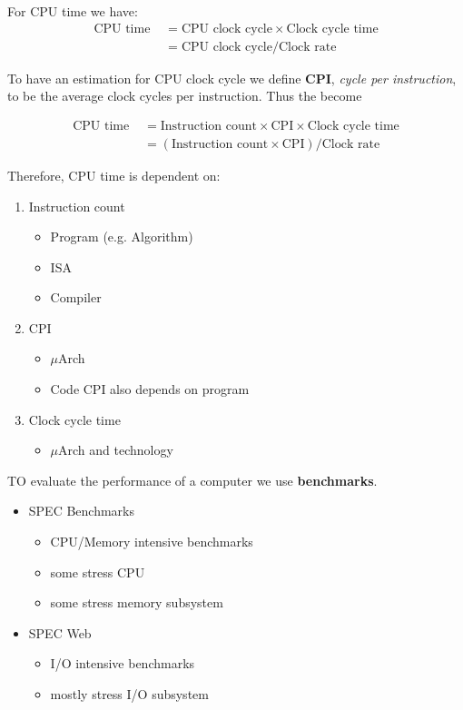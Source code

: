 For CPU time we have:
\begin{align}
    \text{CPU time } & = \text{CPU clock cycle} \times \text{Clock cycle time} \label{eq:CPUTime1} \\
                     & = \text{CPU clock cycle} / \text{Clock rate} \label{eq:CPUTime2}
\end{align}

To have an estimation for CPU clock cycle we define \textbf{CPI}, \textit{cycle per instruction}, to be the average clock cycles per instruction. Thus the  become

\begin{align*}
    \text{CPU time } & = \text{Instruction count} \times \text{CPI} \times \text{Clock cycle time} \\
                     & = (\text{Instruction count} \times \text{CPI}) / \text{Clock rate}
\end{align*}

Therefore, CPU time is dependent on:
\begin{enumerate}
    \item Instruction count
          \begin{itemize}
              \item Program (e.g. Algorithm)
              \item ISA
              \item Compiler
          \end{itemize}
    \item CPI
          \begin{itemize}
              \item \(\mu\)Arch
              \item Code CPI also depends on program
          \end{itemize}
    \item Clock cycle time
          \begin{itemize}
              \item \(\mu\)Arch and technology
          \end{itemize}
\end{enumerate}

TO evaluate the performance of a computer we use \textbf{benchmarks}.

\begin{itemize}
    \item SPEC Benchmarks
          \begin{itemize}
              \item CPU/Memory intensive benchmarks
              \item some stress CPU
              \item some stress memory subsystem
          \end{itemize}
    \item SPEC Web
          \begin{itemize}
              \item I/O intensive benchmarks
              \item mostly stress I/O subsystem
          \end{itemize}
\end{itemize}

